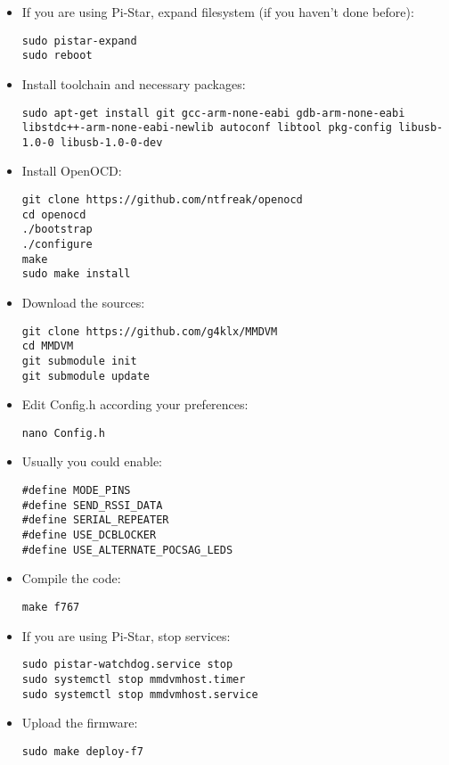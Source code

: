 \documentclass[]{article}
\begin{document}
\begin{itemize}[leftmargin=*]

\item If you are using Pi-Star, expand filesystem (if you haven't done before):
\begin{lstlisting}[style=DOS]
sudo pistar-expand
sudo reboot
\end{lstlisting}

\item Install toolchain and necessary packages:
\begin{lstlisting}[style=DOS]
sudo apt-get install git gcc-arm-none-eabi gdb-arm-none-eabi libstdc++-arm-none-eabi-newlib autoconf libtool pkg-config libusb-1.0-0 libusb-1.0-0-dev
\end{lstlisting}

\item Install OpenOCD:
\begin{lstlisting}[style=DOS]
git clone https://github.com/ntfreak/openocd
cd openocd
./bootstrap
./configure
make
sudo make install
\end{lstlisting}

\item Download the sources:
\begin{lstlisting}[style=DOS]
git clone https://github.com/g4klx/MMDVM
cd MMDVM
git submodule init
git submodule update
\end{lstlisting}

\item Edit Config.h according your preferences:
\begin{lstlisting}[style=DOS]
nano Config.h
\end{lstlisting}

\item Usually you could enable:

\begin{verbatim}
#define MODE_PINS
#define SEND_RSSI_DATA
#define SERIAL_REPEATER
#define USE_DCBLOCKER
#define USE_ALTERNATE_POCSAG_LEDS
\end{verbatim}

\item Compile the code:
\begin{lstlisting}[style=DOS]
make f767
\end{lstlisting}

\item If you are using Pi-Star, stop services:
\begin{lstlisting}[style=DOS]
sudo pistar-watchdog.service stop
sudo systemctl stop mmdvmhost.timer
sudo systemctl stop mmdvmhost.service
\end{lstlisting}

\item Upload the firmware:
\begin{lstlisting}[style=DOS]
sudo make deploy-f7
\end{lstlisting}

\end{itemize}
\end{document}
